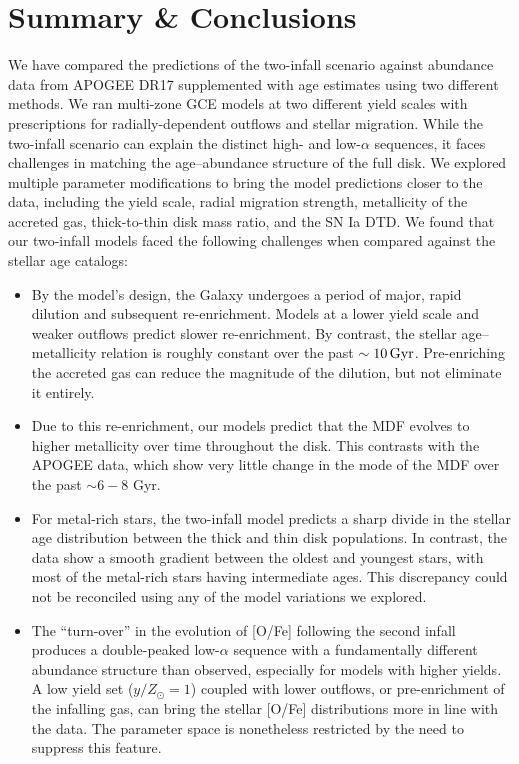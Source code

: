 \documentclass[twocolumn,twocolappendix,linenumbers]{aastex631}
\newcommand{\yZ}[1]{$y/Z_\odot=#1$}
\newcommand{\Gyr}{\,{\rm Gyr}}
\begin{document}
\section{Summary \& Conclusions}
\label{sec:conclusions}

We have compared the predictions of the two-infall scenario against abundance data from APOGEE DR17 supplemented with age estimates using two different methods. We ran multi-zone GCE models at two different yield scales with prescriptions for radially-dependent outflows and stellar migration. While the two-infall scenario can explain the distinct high- and low-$\alpha$ sequences, it faces challenges in matching the age--abundance structure of the full disk. We explored multiple parameter modifications to bring the model predictions closer to the data, including the yield scale, radial migration strength, metallicity of the accreted gas, thick-to-thin disk mass ratio, and the SN Ia DTD. We found that our two-infall models faced the following challenges when compared against the stellar age catalogs:

\begin{itemize}
    \item By the model's design, the Galaxy undergoes a period of major, rapid dilution and subsequent re-enrichment. Models at a lower yield scale and weaker outflows predict slower re-enrichment. By contrast, the stellar age--metallicity relation is roughly constant over the past $\sim10\Gyr$. Pre-enriching the accreted gas can reduce the magnitude of the dilution, but not eliminate it entirely.
    \item Due to this re-enrichment, our models predict that the MDF evolves to higher metallicity over time throughout the disk. This contrasts with the APOGEE data, which show very little change in the mode of the MDF over the past $\sim6-8$ Gyr.
    \item For metal-rich stars, the two-infall model predicts a sharp divide in the stellar age distribution between the thick and thin disk populations. In contrast, the data show a smooth gradient between the oldest and youngest stars, with most of the metal-rich stars having intermediate ages. This discrepancy could not be reconciled using any of the model variations we explored.
    \item The ``turn-over'' in the evolution of [O/Fe] following the second infall produces a double-peaked low-$\alpha$ sequence with a fundamentally different abundance structure than observed, especially for models with higher yields. A low yield set (\yZ{1}) coupled with lower outflows, or pre-enrichment of the infalling gas, can bring the stellar [O/Fe] distributions more in line with the data. The parameter space is nonetheless restricted by the need to suppress this feature.
\end{itemize}
\end{document}
